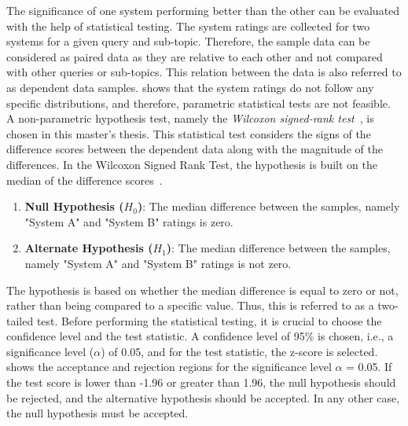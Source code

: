 The significance of one system performing better than the other can be evaluated with the help of statistical testing. The system ratings are collected for two systems for a given query and sub-topic. Therefore, the sample data can be considered as paired data as they are relative to each other and not compared with other queries or sub-topics. This relation between the data is also referred to as dependent data samples.  shows that the system ratings do not follow any specific distributions, and therefore, parametric statistical tests are not feasible. A non-parametric hypothesis test, namely the \emph{Wilcoxon signed-rank test}~\cite{buWilcoxonSigned}, is chosen in this master's thesis. This statistical test considers the signs of the difference scores between the dependent data along with the magnitude of the differences. In the Wilcoxon Signed Rank Test, the hypothesis is built on the median of the difference scores~\cite{buWilcoxonSigned, kaur2015comparative}.


\begin{enumerate}
	\item \textbf{Null Hypothesis ($H_0$)}: The median difference between the samples, namely "System A" and "System B" ratings is zero.
	
	\item \textbf{Alternate Hypothesis ($H_1$)}:  The median difference between the samples, namely "System A" and "System B" ratings is not zero.
\end{enumerate}

The hypothesis is based on whether the median difference is equal to zero or not, rather than being compared to a specific value. Thus, this is referred to as a two-tailed test. Before performing the statistical testing, it is crucial to choose the confidence level and the test statistic. A confidence level of 95\% is chosen, i.e., a significance level ($\alpha$) of 0.05, and for the test statistic, the z-score is selected.  shows the acceptance and rejection regions for the significance level $\alpha$ = 0.05. If the test score is lower than -1.96 or greater than 1.96, the null hypothesis should be rejected, and the alternative hypothesis should be accepted. In any other case, the null hypothesis must be accepted.


